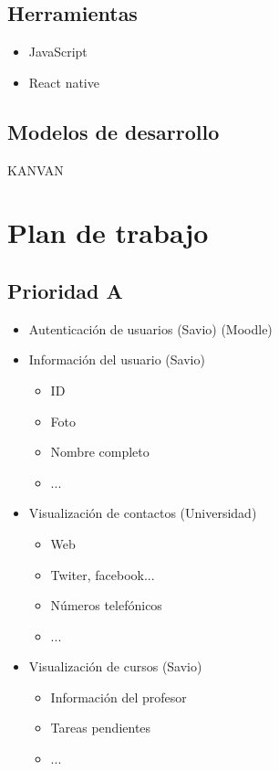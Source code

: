     \subsection{Herramientas}
        \begin{itemize}
             \item JavaScript
             \item React native
        \end{itemize}
     \subsection{Modelos de desarrollo}
         KANVAN

\section{Plan de trabajo}

\subsection{Prioridad A}
\begin{itemize}
 \item Autenticación de usuarios (Savio) (Moodle)
 \item Información del usuario (Savio)
    \begin{itemize}
         \item ID
         \item Foto
         \item Nombre completo
         \item ...
    \end{itemize}
 \item Visualización de contactos (Universidad)
  \begin{itemize}
         \item Web
         \item Twiter, facebook...
         \item Números telefónicos
         \item ...
    \end{itemize}
 \item Visualización de cursos (Savio)
   \begin{itemize}
         \item Información del profesor
         \item Tareas pendientes
         \item ...
    \end{itemize}
\end{itemize}


